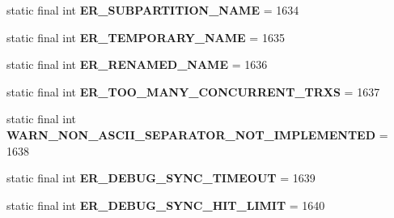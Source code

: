 \begin{DoxyCompactItemize}
static final int {\bfseries E\+R\+\_\+\+S\+U\+B\+P\+A\+R\+T\+I\+T\+I\+O\+N\+\_\+\+N\+A\+ME} = 1634
\item 
\mbox{\label{classcom_1_1mysql_1_1cj_1_1exceptions_1_1_mysql_error_numbers_aea8b9f0558fc494bbb0147c496625e33}} 
static final int {\bfseries E\+R\+\_\+\+T\+E\+M\+P\+O\+R\+A\+R\+Y\+\_\+\+N\+A\+ME} = 1635
\item 
\mbox{\label{classcom_1_1mysql_1_1cj_1_1exceptions_1_1_mysql_error_numbers_aad69e977140ca01fdbe1a1b8cc9ba640}} 
static final int {\bfseries E\+R\+\_\+\+R\+E\+N\+A\+M\+E\+D\+\_\+\+N\+A\+ME} = 1636
\item 
\mbox{\label{classcom_1_1mysql_1_1cj_1_1exceptions_1_1_mysql_error_numbers_a75e755e2cff7c440022fc6084ac43d25}} 
static final int {\bfseries E\+R\+\_\+\+T\+O\+O\+\_\+\+M\+A\+N\+Y\+\_\+\+C\+O\+N\+C\+U\+R\+R\+E\+N\+T\+\_\+\+T\+R\+XS} = 1637
\item 
\mbox{\label{classcom_1_1mysql_1_1cj_1_1exceptions_1_1_mysql_error_numbers_ace8166698c6510fd0ae8ff7363313297}} 
static final int {\bfseries W\+A\+R\+N\+\_\+\+N\+O\+N\+\_\+\+A\+S\+C\+I\+I\+\_\+\+S\+E\+P\+A\+R\+A\+T\+O\+R\+\_\+\+N\+O\+T\+\_\+\+I\+M\+P\+L\+E\+M\+E\+N\+T\+ED} = 1638
\item 
\mbox{\label{classcom_1_1mysql_1_1cj_1_1exceptions_1_1_mysql_error_numbers_af30742ee3872eccd08514384fbc46747}} 
static final int {\bfseries E\+R\+\_\+\+D\+E\+B\+U\+G\+\_\+\+S\+Y\+N\+C\+\_\+\+T\+I\+M\+E\+O\+UT} = 1639
\item 
\mbox{\label{classcom_1_1mysql_1_1cj_1_1exceptions_1_1_mysql_error_numbers_a33800aeb9ab2d3b50b16b4c8787abb22}} 
static final int {\bfseries E\+R\+\_\+\+D\+E\+B\+U\+G\+\_\+\+S\+Y\+N\+C\+\_\+\+H\+I\+T\+\_\+\+L\+I\+M\+IT} = 1640
\item 
\mbox{\label{classcom_1_1mysql_1_1cj_1_1exceptions_1_1_mysql_error_numbers_aab7bd2d1f9aa46e14a796bb828505201}} 

\end{DoxyCompactItemize}
